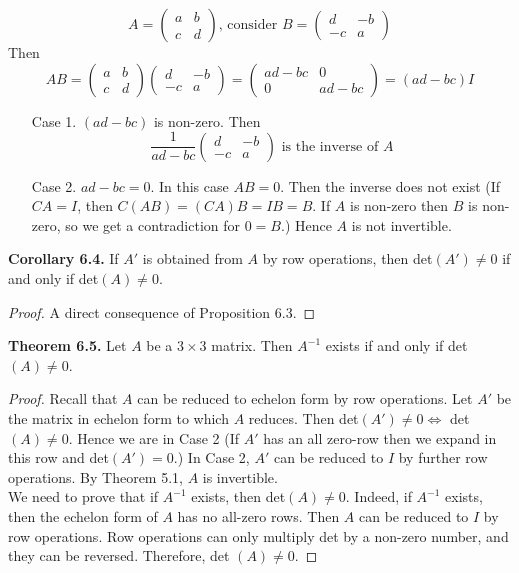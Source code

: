 \[A = \begin{pmatrix}
 a & b \\ c & d	
 \end{pmatrix} \text{, consider }
B= \begin{pmatrix}
 d & -b \\ -c & a	
 \end{pmatrix}
\]
Then \[
AB = \begin{pmatrix}
 a & b \\ c & d	
 \end{pmatrix} \begin{pmatrix}
 d & -b \\ -c & a	
 \end{pmatrix} = \begin{pmatrix}
 ad -bc & 0\\ 0 & ad-bc	
 \end{pmatrix} = (ad -bc)I
\]

\begin{enumerate}
\item[Case 1.] $(ad -bc)$ is non-zero. Then\[
\frac{1}{ad-bc}\begin{pmatrix}
d & -b \\ -c & a	
\end{pmatrix}
\text{ is the inverse of } A
\]	
\item[Case 2.] $ad -bc = 0$. In this case $AB = 0$. Then the inverse does not exist (If $CA = I$, then $C(AB) = (CA)B = IB = B.$ If $A$ is non-zero then $B$ is non-zero, so we get a contradiction for $0 = B$.) Hence $A$ is not invertible. 
\end{enumerate}


\noindent \textbf{Corollary 6.4.} If $A'$ is obtained from $A$ by row operations, then det$(A') \neq 0$ if and only if det$(A) \neq 0$.
\begin{proof}
A direct consequence of Proposition 6.3.	
\end{proof}\vspace*{10pt}

\noindent \textbf{Theorem 6.5.} Let $A$ be a $3 \times 3$ matrix. Then $A^{-1}$ exists if and only if det$(A) \neq 0$.
\begin{proof}
Recall that $A$ can be reduced to echelon form by row operations. Let $A'$ be the matrix in echelon form to which $A$ reduces. Then det$(A')\neq 0 \iff$ det$(A) \neq 0$. Hence we are in Case 2 (If $A'$ has an all zero-row then we expand in this row and det$(A') = 0$.) In Case 2, $A'$ can be reduced to $I$ by further row operations. By Theorem 5.1, $A$ is invertible.\\

We   need to prove that if $A^{-1}$ exists, then det$(A) \neq 0$. Indeed, if $A^{-1}$ exists, then the echelon form of $A$ has no all-zero rows. Then $A$ can be reduced to $I$ by row operations. Row operations can only multiply det by a non-zero number, and they can be reversed. Therefore, det $(A) \neq 0$.	
\end{proof}\vspace*{10pt}

